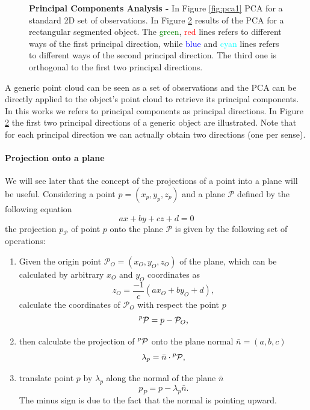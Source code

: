 \begin{figure}[tb]
\begin{subfigure}[t]{0.45\textwidth}
\caption{}\label{fig:pca2}
\end{subfigure}
\caption{\textbf{Principal Components Analysis -} In Figure \ref{fig:pca1} PCA for a standard 2D set of observations. In Figure \ref{fig:pca2} results of the PCA for a rectangular segmented object. The \textcolor{green}{green}, \textcolor{red}{red} lines refers to different ways of the first principal direction, while \textcolor{blue}{blue} and \textcolor{cyan}{cyan} lines refers to different ways of the second principal direction. The third one is orthogonal to the first two principal directions.}
\end{figure}

A generic point cloud can be seen as a set of observations and the PCA can be directly applied to the object's point cloud to retrieve its principal components. In this works we refers to principal components as principal directions. In Figure \ref{fig:pca2} the first two principal directions of a generic object are illustrated. Note that for each principal direction we can actually obtain two directions (one per sense).

\paragraph{Projection onto a plane}
We will see later that the concept of the projections of a point into a plane will be useful. Considering a point $p=(x_p,y_p,z_p)$ and a plane $\mathcal{P}$ defined by the following equation
\begin{equation}
a x + by + cz + d = 0
\end{equation}
the projection $p_{\mathcal{P}}$ of point $p$ onto the plane $\mathcal{P}$ is given by the following set of operations:
\begin{enumerate}
\item Given the origin point $\mathcal{P}_O=(x_O,y_O,z_O)$ of the plane, which can be calculated by arbitrary $x_O$ and $y_O$ coordinates as
\[
z_O = \frac{-1}{c}(ax_O + by_O + d),
\]
calculate the coordinates of $\mathcal{P}_O$ with respect the point $p$
\[
\mathcal{\prescript{p}{}P} = p - \mathcal{P}_O,
\]
\item then calculate the projection of $\mathcal{\prescript{p}{}P}$ onto the plane normal $\bar{n}=(a,b,c)$
\[
\lambda_p = \bar{n} \cdot \mathcal{\prescript{p}{}P}, 
\]
\item translate point $p$ by $\lambda_p$ along the normal of the plane $\bar{n}$
\[
p_P = p - \lambda_p \bar{n}. 
\]
The minus sign is due to the fact that the normal is pointing upward.
\end{enumerate}

